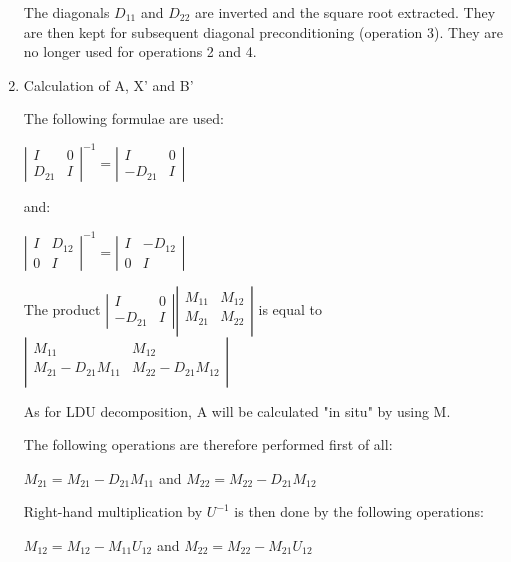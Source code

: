 \begin{enumerate}
The diagonals $D_{11}$ and $D_{22}$ are inverted and the square root extracted.
They are then kept for subsequent diagonal preconditioning (operation 3). They
are no longer used for operations 2 and 4.

\item Calculation of A, X' and B'

The following formulae are used:

$\left|
\begin{array}{cc}
  I & 0 \\
  D_{21} & I
\end{array}
\right|^{-1}
=
\left|
\begin{array}{cc}
  I & 0 \\
  -D_{21} & I
\end{array}
\right|$

and:

$\left|
\begin{array}{cc}
  I & D_{12} \\
  0 & I
\end{array}
\right|^{-1}
=
\left|
\begin{array}{cc}
  I & -D_{12} \\
  0 & I
\end{array}
\right|$

The product
$\left|
\begin{array}{cc}
  I & 0 \\
  -D_{21} & I
\end{array}
\right|
\left|
\begin{array}{cc}
  M_{11} & M_{12} \\
  M_{21} & M_{22} \\
\end{array}
\right|$
is equal to
$\left|
\begin{array}{cc}
  M_{11} & M_{12} \\
  M_{21} - D_{21}M_{11} & M_{22} - D_{21}M_{12} \\
\end{array}
\right|$

As for LDU decomposition, A will be calculated "in situ" by using M.

The following operations are therefore performed first of all:

$M_{21} = M_{21} - D_{21}M_{11}$ and $M_{22} = M_{22} - D_{21}M_{12}$


Right-hand multiplication by $U^{-1}$ is then done by the following operations:

$M_{12} = M_{12} - M_{11}U_{12}$ and $M_{22} = M_{22} - M_{21}U_{12}$


\end{enumerate}
